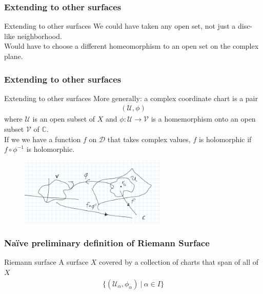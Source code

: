 \documentclass{beamer}[10]
\begin{document}
\begin{frame}
	\frametitle{Extending to other surfaces}
	\begin{block}{Extending to other surfaces}
		\vspace*{0.5cm}
		We could have taken any open set, not just a disc-like neighborhood.\\
		\vspace*{0.5cm}
		Would have to choose a different homeomorphism to an open set on the complex plane.
	\end{block}
\end{frame}

\begin{frame}
	\frametitle{Extending to other surfaces}
	\begin{block}{Extending to other surfaces}
		More generally: a complex coordinate chart is a pair
		\begin{equation}
			\begin{aligned}
				(\mathcal{U},\phi)
			\end{aligned}
		\end{equation}
	where $\mathcal{U}$ is an open subset of $X$ and $\phi:\mathcal{U}\to \mathcal{V}$ is a homemorphism onto an open subset $\mathcal{V}$ of $\mathds{C}$.\\
	\vspace*{0.5cm} If we we have a function $f$ on $\mathcal{D}$ that takes complex values, $f$ is holomorphic if $f\circ \phi^{-1}$ is holomorphic.
	\end{block}
\begin{figure}
	\includegraphics[width=7cm]{4}
\end{figure}
\end{frame}

\begin{frame}
	\frametitle{Naïve preliminary definition of Riemann Surface}
	\begin{block}{Riemann surface}
	A surface $X$ covered by a collection of charts that span of all of $X$
	\begin{equation}
		\begin{aligned}
			\{(\mathcal{U}_\alpha,\phi_\alpha)~\big|~\alpha\in I\}
		\end{aligned}
	\end{equation}
	\end{block}
\end{frame} 
\end{document}
